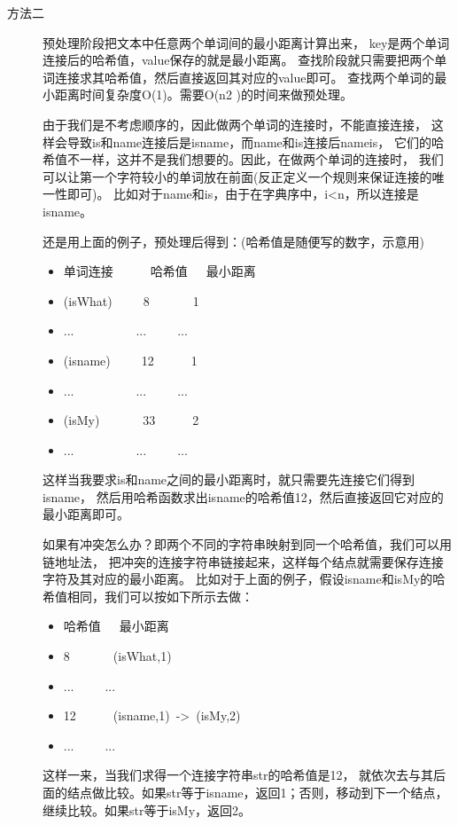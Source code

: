 \begin{description}
\begin{description}
\item[方法二] 预处理阶段把文本中任意两个单词间的最小距离计算出来， key是两个单词连接后的哈希值，value保存的就是最小距离。 查找阶段就只需要把两个单词连接求其哈希值，然后直接返回其对应的value即可。 查找两个单词的最小距离时间复杂度O(1)。需要O(n2 )的时间来做预处理。

由于我们是不考虑顺序的，因此做两个单词的连接时，不能直接连接， 这样会导致is和name连接后是isname，而name和is连接后nameis， 它们的哈希值不一样，这并不是我们想要的。因此，在做两个单词的连接时， 我们可以让第一个字符较小的单词放在前面(反正定义一个规则来保证连接的唯一性即可)。 比如对于name和is，由于在字典序中，i<n，所以连接是isname。

还是用上面的例子，预处理后得到：(哈希值是随便写的数字，示意用)

\begin{itemize}
  \itemsep=-3pt
\item 单词连接\ \ \ \ \ \ 哈希值\ \ \ 最小距离
\item (isWhat)\ \ \ \ \ 8\ \ \ \ \ \ \ 1
\item ...\ \ \ \ \ \ \ \ \ \ ...\ \ \ \ \ ...
\item (isname)\ \ \ \ \ 12\ \ \ \ \ \ 1
\item ...\ \ \ \ \ \ \ \ \ \ ...\ \ \ \ \ ...
\item (isMy)\ \ \ \ \ \ \ 33\ \ \ \ \ \ 2
\item ...\ \ \ \ \ \ \ \ \ \ ...\ \ \ \ \ ...
\end{itemize}
这样当我要求is和name之间的最小距离时，就只需要先连接它们得到isname， 然后用哈希函数求出isname的哈希值12，然后直接返回它对应的最小距离即可。

如果有冲突怎么办？即两个不同的字符串映射到同一个哈希值，我们可以用链地址法， 把冲突的连接字符串链接起来，这样每个结点就需要保存连接字符及其对应的最小距离。 比如对于上面的例子，假设isname和isMy的哈希值相同，我们可以按如下所示去做：
\begin{itemize}
  \itemsep=-3pt
\item 哈希值\ \ \ 最小距离
\item 8\ \ \ \ \ \ \ (isWhat,1)
\item ...\ \ \ \ \ ...
\item 12\ \ \ \ \ \ (isname,1)\ ->\ (isMy,2)
\item ...\ \ \ \ \ ...
\end{itemize}
这样一来，当我们求得一个连接字符串str的哈希值是12， 就依次去与其后面的结点做比较。如果str等于isname，返回1；否则，移动到下一个结点， 继续比较。如果str等于isMy，返回2。


\end{description}
\end{description}
